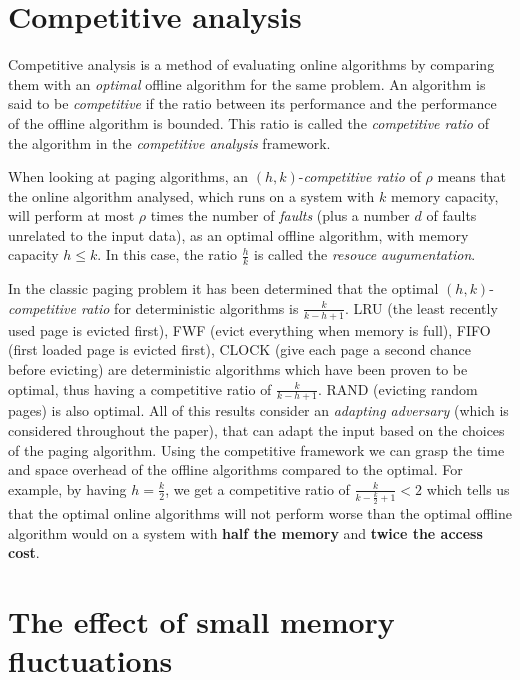 \section*{Competitive analysis \cite{peserico2013paging34}}

Competitive analysis \cite{karlin1988competitive} is a method of evaluating
online algorithms by comparing them with an \emph{optimal} offline algorithm
for the same problem. An algorithm is said to be \emph{competitive} if the
ratio between its performance and the performance of the offline algorithm is
bounded. This ratio is called the \emph{competitive ratio} of the algorithm in
the \emph{competitive analysis} framework. 

When looking at paging algorithms, an $(h, k)$-\emph{competitive ratio} of
$\rho$ means that the online algorithm analysed, which runs on a system with $k$
memory capacity, will perform at most $\rho$ times the number of \emph{faults}
(plus a number $d$ of faults unrelated to the input data), as an optimal offline
algorithm, with memory capacity $h \leq k$. In this case, the ratio $\frac{h}{k}$ is 
called the \emph{resouce augumentation}.

In the classic paging problem it has been determined that the optimal $(h,
k)$-\emph{competitive ratio} for deterministic algorithms is $\frac{k}{k - h +
1}$. LRU (the least recently used page is evicted first), FWF (evict everything
when memory is full), FIFO (first loaded page is evicted first), CLOCK (give
each page a second chance before evicting) are deterministic algorithms which
have been proven to be optimal, thus having a competitive ratio of $\frac{k}{k
- h + 1}$. RAND (evicting random pages) is also optimal. All of this results
consider an \emph{adapting adversary} (which is considered throughout the
paper), that can adapt the input based on the choices of the paging algorithm.
Using the competitive framework we can grasp the time and space overhead of the
offline algorithms compared to the optimal. For example, by having $h =
\frac{k}{2}$, we get a competitive ratio of $\frac{k}{k - \frac{k}{2} + 1} < 2$
which tells us that the optimal online algorithms will not perform worse than
the optimal offline algorithm would on a system with \textbf{half the memory}
and \textbf{twice the access cost}.

\section*{The effect of small memory fluctuations \cite{peserico2013paging811}}


